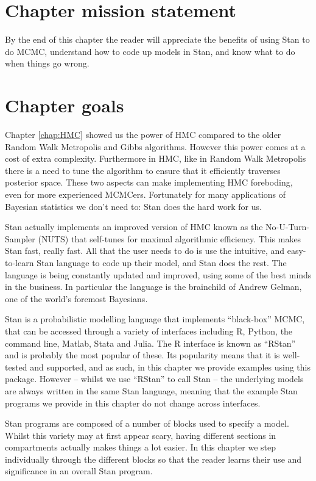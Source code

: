 \documentclass[11pt,fullpage]{book}
\begin{document}
\section{Chapter mission statement}
By the end of this chapter the reader will appreciate the benefits of using Stan to do MCMC, understand how to code up models in Stan, and know what to do when things go wrong.

\section{Chapter goals}
Chapter \ref{chap:HMC} showed us the power of HMC compared to the older Random Walk Metropolis and Gibbs algorithms. However this power comes at a cost of extra complexity. Furthermore in HMC, like in Random Walk Metropolis there is a need to tune the algorithm to ensure that it efficiently traverses posterior space. These two aspects can make implementing HMC foreboding, even for more experienced MCMCers. Fortunately for many applications of Bayesian statistics we don't need to: Stan \citep{carpenter2016stan} does the hard work for us.

Stan actually implements an improved version of HMC known as the No-U-Turn-Sampler (NUTS) that self-tunes for maximal algorithmic efficiency. This makes Stan fast, really fast. All that the user needs to do is use the intuitive, and easy-to-learn Stan language to code up their model, and Stan does the rest. The language is being constantly updated and improved, using some of the best minds in the business. In particular the language is the brainchild of Andrew Gelman, one of the world's foremost Bayesians. 

Stan is a probabilistic modelling language that implements ``black-box'' MCMC, that can be accessed through a variety of interfaces including R, Python, the command line, Matlab, Stata and Julia. The R interface is known as ``RStan'' and is probably the most popular of these. Its popularity means that it is well-tested and supported, and as such, in this chapter we provide examples using this package. However -- whilst we use ``RStan'' to call Stan -- the underlying models are always written in the same Stan language, meaning that the example Stan programs we provide in this chapter do not change across interfaces.

Stan programs are composed of a number of blocks used to specify a model. Whilst this variety may at first appear scary, having different sections in compartments actually makes things a lot easier. In this chapter we step individually through the different blocks so that the reader learns their use and significance in an overall Stan program. 
\end{document}
